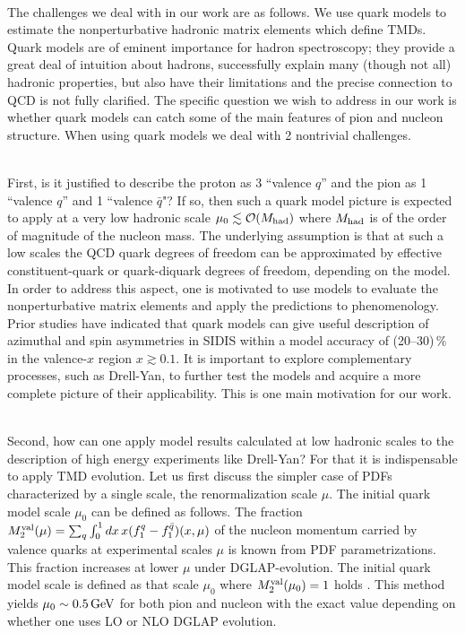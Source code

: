 \documentclass[a4paper]{article}
\begin{document}
\ \\
The challenges we deal with in our work are as follows. 
We use quark models to estimate the nonperturbative hadronic 
matrix elements which define TMDs. Quark models are of eminent importance 
for hadron spectroscopy; they provide a great deal of intuition about hadrons,
successfully explain many (though not all) hadronic properties, but 
also have their limitations and the precise connection to QCD is not 
fully clarified. The specific question 
we wish to address in our work is whether quark models can catch some of 
the main features of pion and nucleon structure. When using quark models 
we deal with 2 nontrivial challenges.

\ \\
First, is it justified to describe the proton as 3 ``valence $q$'' 
and the pion as 1 ``valence $q$'' and 1 ``valence $\bar{q}$"? If so, 
then such a quark model picture is expected to apply at a very low 
hadronic scale $\mu_0 \lesssim {\cal O}(M_{\rm had})$ where $M_{\rm had}$ 
is of the order of magnitude of the nucleon mass. The 
underlying assumption is that at such a low scales the QCD quark degrees 
of freedom can be approximated by effective constituent-quark or 
quark-diquark degrees of freedom, depending on the model.  
In order to address this aspect, one is motivated to use models to evaluate the nonperturbative matrix elements and apply the predictions to phenomenology. 
Prior studies have indicated 
that quark models can give useful description of azimuthal and spin
asymmetries in SIDIS within a model accuracy of (20--30)$\,\%$  
in the valence-$x$ region $x\gtrsim 0.1$. It is important to explore
complementary processes, such as Drell-Yan, to further test the models 
and acquire a more complete picture of their applicability. This is one 
main motivation for our work.

\ \\
Second, how can one apply model results calculated at low hadronic scales 
to the description of high energy experiments like Drell-Yan? For that it 
is indispensable to apply TMD evolution. Let us first discuss the simpler
case of PDFs characterized by a single scale, the renormalization scale
$\mu$. The initial quark model scale $\mu_0$ can be defined as follows. 
The fraction 
$M_2^{\rm val}(\mu)=\sum_q\int_0^1dx\,x(f_1^q-f_1^{\bar q})(x,\mu)$
of the nucleon momentum 
carried by valence quarks at experimental scales $\mu$ is known 
from PDF parametrizations. This fraction increases at lower $\mu$
under DGLAP-evolution. The initial quark model 
scale is defined as that scale $\mu_0$ where $M_2^{\rm val}(\mu_0)=1$ holds
\cite{Traini:1997jz}. This method yields $\mu_0 \sim 0.5\,{\rm GeV}$
for both pion and nucleon with the exact value depending on whether 
one uses LO or NLO DGLAP evolution.
\end{document}
